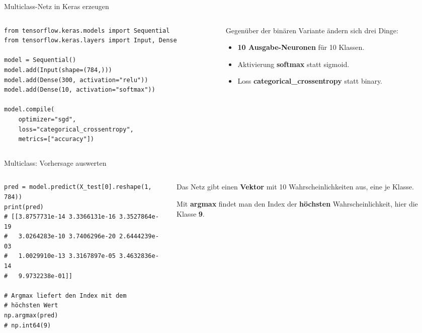 \begin{frame}[fragile]{Multiclass-Netz in Keras erzeugen}
\begin{columns}
\begin{column}{0.60\textwidth}
\begin{verbatim}
from tensorflow.keras.models import Sequential
from tensorflow.keras.layers import Input, Dense

model = Sequential()
model.add(Input(shape=(784,)))
model.add(Dense(300, activation="relu"))  
model.add(Dense(10, activation="softmax"))

model.compile(
    optimizer="sgd",
    loss="categorical_crossentropy",
    metrics=["accuracy"])
\end{verbatim}
\end{column}
\begin{column}{0.35\textwidth}
Gegenüber der binären Variante ändern sich drei Dinge:
\begin{itemize}
\item \textbf{10 Ausgabe-Neuronen} für 10 Klassen.
\item Aktivierung \textbf{softmax} statt sigmoid.
\item Loss \textbf{categorical\_crossentropy} statt binary.
\end{itemize}
\end{column}
\end{columns}
\end{frame}

\begin{frame}[fragile]{Multiclass: Vorhersage auswerten}
\begin{columns}
\begin{column}{0.60\textwidth}
\begin{verbatim}
pred = model.predict(X_test[0].reshape(1, 784))
print(pred)
# [[3.8757731e-14 3.3366131e-16 3.3527864e-19 
#   3.0264283e-10 3.7406296e-20 2.6444239e-03 
#   1.0029910e-13 3.3167897e-05 3.4632836e-14 
#   9.9732238e-01]]

# Argmax liefert den Index mit dem
# höchsten Wert
np.argmax(pred)
# np.int64(9)
\end{verbatim}
\end{column}
\begin{column}{0.35\textwidth}
Das Netz gibt einen \textbf{Vektor} mit 10 Wahrscheinlichkeiten aus, eine je Klasse.

\vspace{0.5em}
Mit \textbf{argmax} findet man den Index der \textbf{höchsten} Wahrscheinlichkeit, hier die Klasse \textbf{9}.
\end{column}
\end{columns}
\end{frame}

